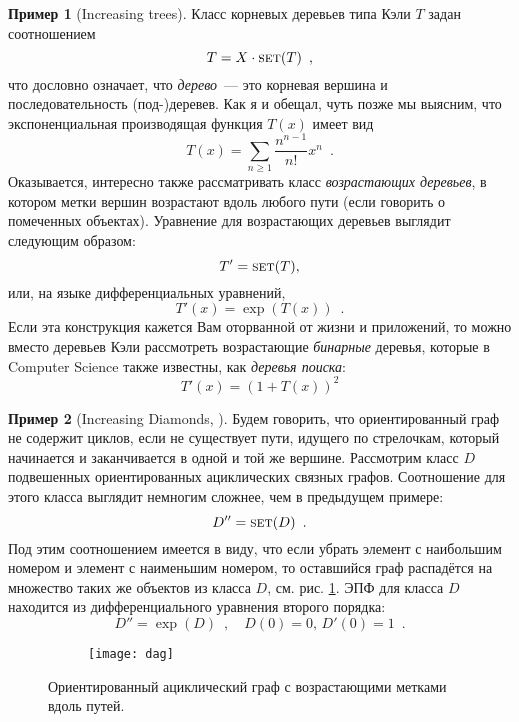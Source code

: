 \documentclass[a5paper]{article}
\theoremstyle{definition}
\newtheorem{example}{Пример}
\begin{document}
\begin{example}[Increasing trees]
    Класс корневых деревьев типа Кэли \( T \) задан соотношением
\[
    T = X \cdot \text{\textsc{set}}(T) \enspace ,
\] 
что дословно означает, что \textit{дерево}~--- это корневая вершина и
последовательность (под-)деревев. Как я и обещал, чуть позже мы выясним, что
экспоненциальная производящая функция \( T(x) \) имеет вид
\[
    T(x) = \sum_{n \geq 1} \dfrac{n^{n-1}}{n!} x^n \enspace .
\]
Оказывается, интересно также рассматривать класс \textit{возрастающих деревьев},
в котором метки вершин возрастают вдоль любого пути (если говорить о помеченных
объектах). Уравнение для возрастающих деревьев выглядит следующим образом:
\[
    T' = \text{\textsc{set}}(T) ,
\]
или, на языке дифференциальных уравнений,
\[
    T'(x) = \exp(T(x)) \enspace .
\]
Если эта конструкция кажется Вам оторванной от жизни и приложений, то можно
вместо деревьев Кэли рассмотреть возрастающие \textit{бинарные} деревья, которые
в Computer Science также известны, как \textit{деревья поиска}:
\[
    T'(x) = (1 + T(x))^2
\]
\end{example}

\begin{example}[Increasing Diamonds, \cite{latin}]
    Будем говорить, что ориентированный граф не содержит циклов, если не
существует пути, идущего по стрелочкам, который начинается и заканчивается в
одной и той же вершине. 
    Рассмотрим класс \( D \) подвешенных ориентированных ациклических связных
графов. Соотношение для этого класса выглядит немногим сложнее, чем в предыдущем
примере:
\[
    D'' = \text{\textsc{set}}(D) \enspace .
\]
Под этим соотношением имеется в виду, что если убрать элемент с наибольшим
номером и элемент с наименьшим номером, то оставшийся граф распадётся на
множество таких же объектов из класса \( D \), см. рис. \ref{fig:dag}. ЭПФ для
класса \( D \) находится из дифференциального уравнения второго порядка:
\[
    D'' = \exp(D) \enspace ,  \quad D(0) = 0, \, D'(0) = 1
\enspace .                                  
\] 
\end{example}
\begin{figure}[h]
\centering
\begin{subfigure}{.8\textwidth}
    \centering
    \texttt{[image: dag]}
\end{subfigure}%
\caption{Ориентированный ациклический граф с возрастающими метками вдоль
путей.}
\label{fig:dag}	
\end{figure}
\end{document}

